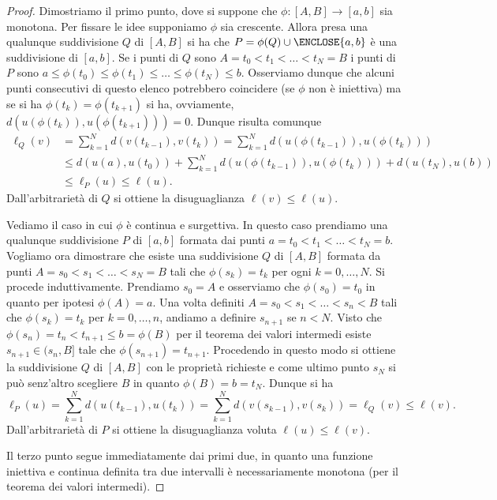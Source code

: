 \begin{proof}
Dimostriamo il primo punto, dove si suppone che $\phi:[A,B] \to [a,b]$ 
sia monotona. Per fissare le idee supponiamo $\phi$ sia crescente.
Allora presa una qualunque suddivisione $Q$ di $[A,B]$ si ha che 
$P=\phi(Q)\cup \ENCLOSE{a,b}$ è una suddivisione di $[a,b]$.
Se i punti di $Q$ sono $A = t_0 < t_1 < \dots < t_N = B$ i punti di 
$P$ sono $a \le \phi(t_0) \le \phi(t_1) \le \dots \le \phi(t_N) \le b$.
Osserviamo dunque che alcuni punti consecutivi di questo elenco 
potrebbero coincidere
(se $\phi$ non è iniettiva) ma se si ha $\phi(t_k) = \phi(t_{k+1})$
si ha, ovviamente, $d(u(\phi(t_k)), u(\phi(t_{k+1}))) = 0$. 
Dunque risulta comunque 
\begin{align*}
 \ell_Q(v) &= \sum_{k=1}^N d(v(t_{k-1}), v(t_k))
  = \sum_{k=1}^N d(u(\phi(t_{k-1})), u(\phi(t_k)))\\
  &\le d(u(a), u(t_0)) + \sum_{k=1}^N d(u(\phi(t_{k-1})), u(\phi(t_k))) + d(u(t_N), u(b))\\
  &\le \ell_P(u) \le \ell(u).
\end{align*}
Dall'arbitrarietà di $Q$ si ottiene la disuguaglianza $\ell(v) \le \ell(u)$.

Vediamo il caso in cui $\phi$ è continua e surgettiva. 
In questo caso prendiamo una qualunque suddivisione $P$ di $[a,b]$ 
formata dai punti $a = t_0 < t_1 < \dots < t_N = b$.
Vogliamo ora dimostrare che esiste una suddivisione $Q$ di $[A,B]$
formata da punti $A = s_0 < s_1 < \dots < s_N = B$ tali 
che $\phi(s_k) = t_k$ per ogni $k=0,\dots,N$. 
Si procede induttivamente. Prendiamo $s_0=A$ e osserviamo che $\phi(s_0) = t_0$
in quanto per ipotesi $\phi(A) = a$.
Una volta definiti $A = s_0 < s_1 < \dots < s_n < B$ tali che $\phi(s_k) = t_k$ per $k=0,\dots,n$,
andiamo a definire $s_{n+1}$ se $n < N$.
Visto che $\phi(s_n) = t_n < t_{n+1} \le b = \phi(B)$ 
per il teorema dei valori intermedi esiste $s_{n+1} \in (s_n, B]$ tale che
$\phi(s_{n+1}) = t_{n+1}$. 
Procedendo in questo modo si ottiene la suddivisione $Q$ di $[A,B]$ 
con le proprietà richieste e come ultimo punto $s_N$ si può senz'altro scegliere $B$ 
in quanto $\phi(B) = b = t_N$.
Dunque si ha 
\[
  \ell_P(u) = \sum_{k=1}^N d(u(t_{k-1}), u(t_k))
  = \sum_{k=1}^N d(v(s_{k-1}), v(s_k)) = \ell_Q(v) \le \ell(v).
\]
Dall'arbitrarietà di $P$ si ottiene la disuguaglianza voluta $\ell(u) \le \ell(v)$.

Il terzo punto segue immediatamente dai primi due, in quanto una funzione iniettiva e continua 
definita tra due intervalli è necessariamente monotona (per il teorema dei valori intermedi).
\end{proof}

